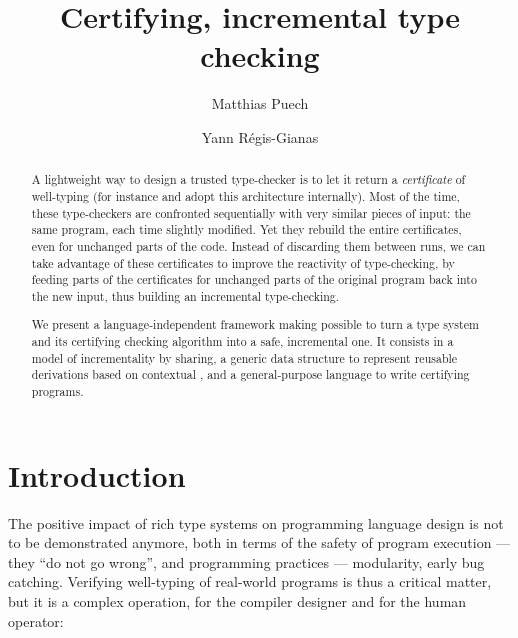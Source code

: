 \documentclass{llncs}
\begin{document}
\title{Certifying, incremental type checking}

\author{Matthias Puech \and Yann R\'egis-Gianas}

\maketitle

\begin{abstract}

  A lightweight way to design a trusted type-checker is to let it
  return a \emph{certificate} of well-typing (for instance
   and  adopt this architecture
  internally).  Most of the time, these type-checkers are confronted
  sequentially with very similar pieces of input: the same program,
  each time slightly modified. Yet they rebuild the entire
  certificates, even for unchanged parts of the code. Instead of
  discarding them between runs, we can take advantage of these
  certificates to improve the reactivity of type-checking, by feeding
  parts of the certificates for unchanged parts of the original
  program back into the new input, thus building an incremental
  type-checking.

  We present a language-independent framework making possible to turn
  a type system and its certifying checking algorithm into a safe,
  incremental one. It consists in a model of incrementality by
  sharing, a generic data structure to represent reusable derivations
  based on contextual \LF, and a general-purpose language to write
  certifying programs.
\end{abstract}


\section*{Introduction}


The positive impact of rich type systems on programming language
design is not to be demonstrated anymore, both in terms of the safety
of program execution --- they ``do not go wrong'', and programming
practices --- modularity, early bug catching. Verifying well-typing of
real-world programs is thus a critical matter, but it is a complex
operation, for the compiler designer and for the human operator:
\end{document}

